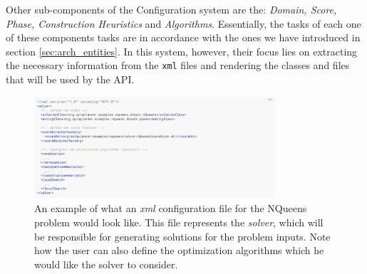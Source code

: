 Other sub-components of the Configuration system are the:
\textit{Domain, Score, Phase, Construction Heuristics} and \textit{Algorithms}.
Essentially, the tasks of each one of these components tasks are in accordance with the ones we have introduced in section \ref{sec:arch_entities}. In this system, however, their focus lies on extracting the necessary information from the \verb!xml! files and rendering the classes and files that will be used by the API.
\begin{figure}
    \centering
    \includegraphics[width=0.8\textwidth]{figures/step2/config_file.png}
    \caption{An example of what an \textit{xml} configuration file for the NQueens problem would look like. This file represents the \textit{solver}, which will be responsible for generating solutions for the problem inputs. Note how the user can also define the optimization algorithms which he would like the solver to consider.}
    \label{fig:ex_config}
\end{figure}
